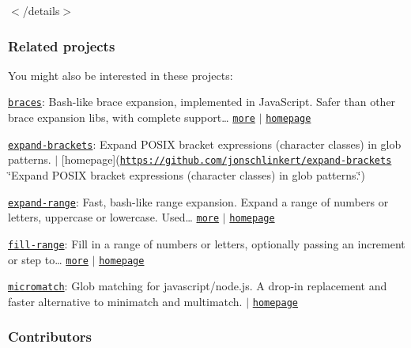 

$<$/details$>$

\subsubsection*{Related projects}

You might also be interested in these projects\+:


\begin{DoxyItemize}
\item \href{https://www.npmjs.com/package/braces}{\tt braces}\+: Bash-\/like brace expansion, implemented in Java\+Script. Safer than other brace expansion libs, with complete support… \href{https://github.com/micromatch/braces}{\tt more} $\vert$ \href{https://github.com/micromatch/braces}{\tt homepage}
\item \href{https://www.npmjs.com/package/expand-brackets}{\tt expand-\/brackets}\+: Expand P\+O\+S\+IX bracket expressions (character classes) in glob patterns. $\vert$ \mbox{[}homepage\mbox{]}(\href{https://github.com/jonschlinkert/expand-brackets}{\tt https\+://github.\+com/jonschlinkert/expand-\/brackets} \char`\"{}\+Expand P\+O\+S\+I\+X bracket expressions (character classes) in glob patterns.\char`\"{})
\item \href{https://www.npmjs.com/package/expand-range}{\tt expand-\/range}\+: Fast, bash-\/like range expansion. Expand a range of numbers or letters, uppercase or lowercase. Used… \href{https://github.com/jonschlinkert/expand-range}{\tt more} $\vert$ \href{https://github.com/jonschlinkert/expand-range}{\tt homepage}
\item \href{https://www.npmjs.com/package/fill-range}{\tt fill-\/range}\+: Fill in a range of numbers or letters, optionally passing an increment or {\ttfamily step} to… \href{https://github.com/jonschlinkert/fill-range}{\tt more} $\vert$ \href{https://github.com/jonschlinkert/fill-range}{\tt homepage}
\item \href{https://www.npmjs.com/package/micromatch}{\tt micromatch}\+: Glob matching for javascript/node.\+js. A drop-\/in replacement and faster alternative to minimatch and multimatch. $\vert$ \href{https://github.com/micromatch/micromatch}{\tt homepage}
\end{DoxyItemize}

\subsubsection*{Contributors}

